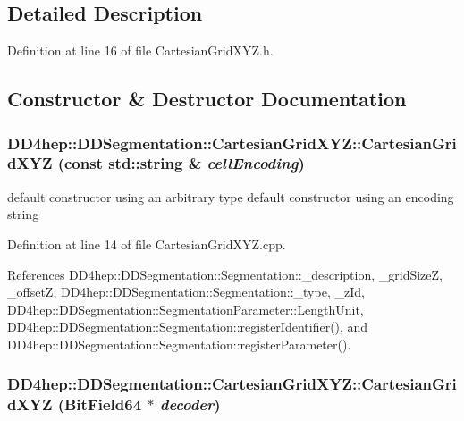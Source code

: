 \subsection{Detailed Description}


Definition at line 16 of file CartesianGridXYZ.h.

\subsection{Constructor \& Destructor Documentation}
\hypertarget{class_d_d4hep_1_1_d_d_segmentation_1_1_cartesian_grid_x_y_z_a1e888c86452db8dc811b59c7b3298b04}{
\subsubsection[{CartesianGridXYZ}]{\setlength{\rightskip}{0pt plus 5cm}DD4hep::DDSegmentation::CartesianGridXYZ::CartesianGridXYZ (const std::string \& {\em cellEncoding})}}
\label{class_d_d4hep_1_1_d_d_segmentation_1_1_cartesian_grid_x_y_z_a1e888c86452db8dc811b59c7b3298b04}


default constructor using an arbitrary type default constructor using an encoding string 

Definition at line 14 of file CartesianGridXYZ.cpp.

References DD4hep::DDSegmentation::Segmentation::\_\-description, \_\-gridSizeZ, \_\-offsetZ, DD4hep::DDSegmentation::Segmentation::\_\-type, \_\-zId, DD4hep::DDSegmentation::SegmentationParameter::LengthUnit, DD4hep::DDSegmentation::Segmentation::registerIdentifier(), and DD4hep::DDSegmentation::Segmentation::registerParameter().\hypertarget{class_d_d4hep_1_1_d_d_segmentation_1_1_cartesian_grid_x_y_z_a0667982b480a2fea3f70a16d8f236e22}{
\subsubsection[{CartesianGridXYZ}]{\setlength{\rightskip}{0pt plus 5cm}DD4hep::DDSegmentation::CartesianGridXYZ::CartesianGridXYZ ({\bf BitField64} $\ast$ {\em decoder})}}
\label{class_d_d4hep_1_1_d_d_segmentation_1_1_cartesian_grid_x_y_z_a0667982b480a2fea3f70a16d8f236e22}


